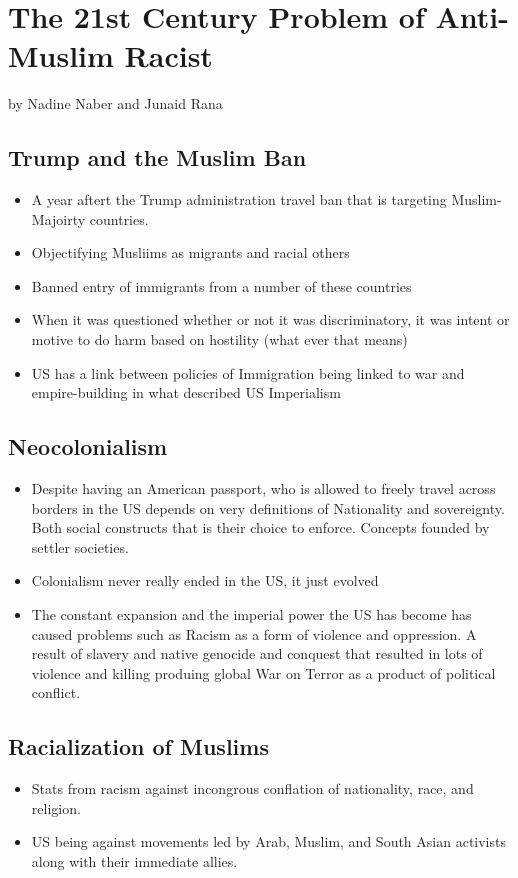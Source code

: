 \documentclass{article}
\begin{document}
  \section{The 21st Century Problem of Anti-Muslim Racist}
  by Nadine Naber and Junaid Rana

  \subsection{Trump and the Muslim Ban}
  \begin{itemize}
    \item A year aftert the Trump administration travel ban
      that is targeting Muslim-Majoirty countries.
    \item Objectifying Musliims as migrants and racial others
    \item Banned entry of immigrants from a number of these countries
    \item When it was questioned whether or not it was
      discriminatory, it was intent or motive to do harm based on hostility
      (what ever that means)
    \item US has a link between policies of Immigration being linked
      to war and empire-building in what described US Imperialism
  \end{itemize}

  \subsection{Neocolonialism}
  \begin{itemize}
    \item Despite having an American passport, who is allowed
      to freely travel across borders in the US depends on very
      definitions of Nationality and sovereignty.
      Both social constructs that is their choice to enforce.
      Concepts founded by settler societies.
    \item Colonialism never really ended in the US, it just evolved
    \item The constant expansion and the imperial power the US
      has become has caused problems such as Racism as a form of
      violence and oppression.
      A result of slavery and native genocide and conquest that resulted
      in lots of violence and killing produing global War on Terror
      as a product of political conflict.
  \end{itemize}


  \subsection{Racialization of Muslims}
  \begin{itemize}
    \item Stats from racism against incongrous conflation
      of nationality, race, and religion.
    \item US being against movements led by Arab, Muslim, and South Asian
      activists along with their immediate allies.
  \end{itemize}
\end{document}

